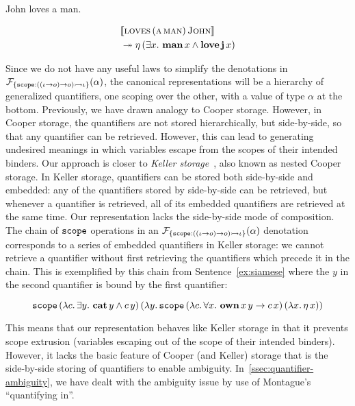 \begin{exe}
  \ex John loves a man. \label{ex:mixed-nps}
\end{exe}

\vspace{-8mm}

\NoChapterPrefix
\begin{align}
& \llbracket \textsc{loves}\,(\textsc{a}\,\textsc{man})\,\textsc{John} \rrbracket \nonumber \\
&\twoheadrightarrow \eta\,(\exists x.\ \textbf{man}\,x \land \textbf{love}\,\textbf{j}\,x)
\end{align}
\ChapterPrefix

Since we do not have any useful laws to simplify the denotations in
$\mathcal{F}_{\{ \mathtt{scope} : ((\iota \to o) \to o) \rightarrowtail \iota \}}(\alpha)$, the
canonical representations will be a hierarchy of generalized quantifiers,
one scoping over the other, with a value of type $\alpha$ at the
bottom. Previously, we have drawn analogy to Cooper storage. However, in
Cooper storage, the quantifiers are not stored hierarchically, but
side-by-side, so that any quantifier can be retrieved. However, this can
lead to generating undesired meanings in which variables escape from the
scopes of their intended binders. Our approach is closer to \emph{Keller
  storage}~\cite{keller1988nested}, also known as nested Cooper storage. In
Keller storage, quantifiers can be stored both side-by-side and embedded:
any of the quantifiers stored by side-by-side can be retrieved, but
whenever a quantifier is retrieved, all of its embedded quantifiers are
retrieved at the same time. Our representation lacks the side-by-side mode
of composition. The chain of $\mathtt{scope}$ operations in an
$\mathcal{F}_{\{ \mathtt{scope} : ((\iota \to o) \to o) \rightarrowtail \iota \}}(\alpha)$
denotation corresponds to a series of embedded quantifiers in Keller
storage: we cannot retrieve a quantifier without first retrieving the
quantifiers which precede it in the chain. This is exemplified by this
chain from Sentence~\ref{ex:siamese} where the $y$ in the second quantifier
is bound by the first quantifier:

$$
\app{\op{scope}}{(\lam{c}{\exists y.\ \ap{\obj{cat}}{y} \land \ap{c}{y}})}
{(\lam{y}{\app{\op{scope}}{(\lam{c}{\forall x.\ \app{\obj{own}}{x}{y} \to \ap{c}{x}})}
{(\lam{x}{\etaE{x}})}})}
$$

This means that our representation behaves like Keller storage in that it
prevents scope extrusion (variables escaping out of the scope of their
intended binders). However, it lacks the basic feature of Cooper (and
Keller) storage that is the side-by-side storing of quantifiers to enable
ambiguity. In~\ref{ssec:quantifier-ambiguity}, we have dealt with the
ambiguity issue by use of Montague's ``quantifying in''.


